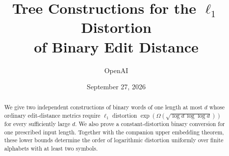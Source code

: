 \documentclass[11pt]{article}
\title{Tree Constructions for the $\ell_1$ Distortion\\
of Binary Edit Distance}
\author{OpenAI}
\date{September 27, 2026}
\theoremstyle{definition}\newtheorem{definition}[theorem]{Definition}
\theoremstyle{remark}\newtheorem{remark}[theorem]{Remark}
\begin{document}
\maketitle
\begin{abstract}
We give two independent constructions of binary words of one length at
most $d$ whose ordinary edit-distance metrics require $\ell_1$ distortion
$\exp(\Omega(\sqrt{\log d\,\log\log d}))$ for every sufficiently large $d$.
We also prove a constant-distortion binary conversion for one prescribed
input length. Together with the companion upper embedding theorem, these
lower bounds determine the order of logarithmic distortion uniformly over
finite alphabets with at least two symbols.
\end{abstract}
\setcounter{tocdepth}{1}
\tableofcontents






\appendix


\end{document}

